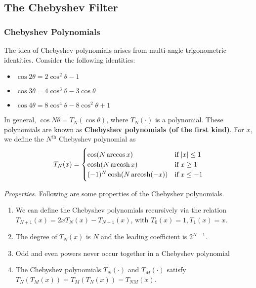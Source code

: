 \documentclass{article}
\theoremstyle{definition}
\DeclareMathOperator{\arccosh}{arcosh}
\begin{document}
\subsection{The Chebyshev Filter}

\subsubsection{Chebyshev Polynomials}

The idea of Chebyshev polynomials arises from multi-angle trigonometric identities. Consider the following identities:
\begin{itemize}
    \item $\cos 2\theta = 2 \cos^2 \theta - 1$
    \item $\cos 3\theta = 4 \cos^3 \theta - 3 \cos \theta$
    \item $\cos 4 \theta = 8 \cos^4 \theta - 8 \cos^2 \theta + 1$
\end{itemize}

In general, $\cos N \theta = T_N(\cos \theta)$, where $T_N(\cdot)$ is a polynomial. These polynomials are known as \textbf{Chebyshev polynomials (of the first kind)}. For $x$, we define the $N^{\text{th}}$ Chebyshev polynomial as
\[
    T_N(x) = 
    \begin{cases}
    
    \cos (N \arccos x) & \text{if} \; \abs{x} \leq 1 \\
    \cosh (N \arccosh x) & \text{if} \; x \geq 1 \\
    (-1)^N \cosh (N \arccosh (-x) ) & \text{if} \; x \leq -1
    
    
    \end{cases}
\]

\textit{Properties.} Following are some properties of the Chebyshev polynomials.

\begin{enumerate}
    \item We can define the Chebyshev polynomials recursively via the relation $T_{N+1}(x) = 2x T_N(x) - T_{N-1}(x)$, with $T_0(x) = 1, T_1(x) = x$.
    \item The degree of $T_N(x)$ is $N$ and the leading coefficient is $2^{N-1}$.
    \item Odd and even powers never occur together in a Chebyshev polynomial
    \item The Chebyshev polynomials $T_N(\cdot)$ and $T_M(\cdot)$ satisfy $T_N(T_M(x)) = T_M(T_N(x)) = T_{NM}(x)$.
\end{enumerate}
\end{document}
